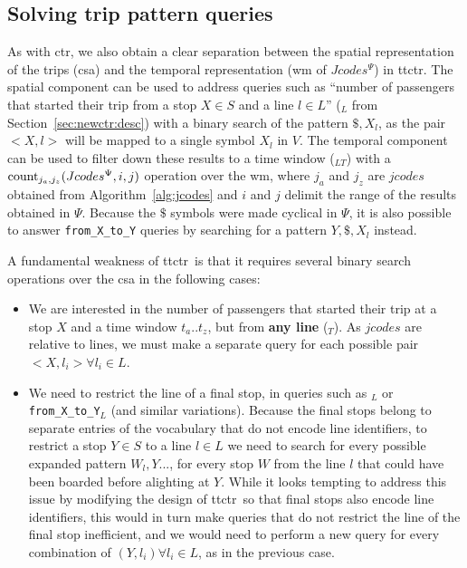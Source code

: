 	\subsection{Solving trip pattern queries}
	\label{sec:newctr:algo:xy}
	As with \gls{ctr}, we also obtain a clear separation between the spatial representation of the trips (\gls{csa}) and the temporal representation (\gls{wm} of $Jcodes^{\Psi}$) in \gls{ttctr}. The spatial component can be used to address queries such as ``number of passengers that started their trip from a stop $X\in S$ and a line $l\in L$'' (\texttt{\startX$_{L}$} from Section~\ref{sec:newctr:desc}) with a binary search of the pattern $\$,X_l$, as the pair $<X,l>$ will be mapped to a single symbol $X_l$ in $V$. The temporal component can be used to filter down these results to a time window (\texttt{\startX$_{LT}$}) with a $\operatorname{count}_{j_a,j_z}(Jcodes^{\Psi},i,j)$ operation over the \gls{wm}, where $j_a$ and $j_z$ are $jcodes$ obtained from Algorithm~\ref{alg:jcodes} and $i$ and $j$ delimit the range of the results obtained in $\Psi$. Because the $\$$ symbols were made cyclical in $\Psi$, it is also possible to answer \texttt{from\_X\_to\_Y} queries by searching for a pattern $Y,\$,X_l$ instead.
	
	A fundamental weakness of \gls{ttctr}~is that it requires several binary search operations over the \gls{csa} in the following cases:
    \begin{itemize}
        \item We are interested in the number of passengers that started their trip at a stop $X$ and a time window $t_a..t_z$, but from \textbf{any line} (\texttt{\startX$_{T}$}). As $jcodes$ are relative to lines, we must make a separate query for each possible pair $<X, l_i> \forall l_i \in L$.
        \item We need to restrict the line of a final stop, in queries such as \texttt{\endX$_{L}$} or \texttt{from\_X\_to\_Y$_{L}$} (and similar variations). Because the final stops belong to separate entries of the vocabulary that do not encode line identifiers, to restrict a stop $Y\in S$ to a line $l\in L$ we need to search for every possible expanded pattern $W_l,Y...$, for every stop $W$ from the line $l$ that could have been boarded before alighting at $Y$. While it looks tempting to address this issue by modifying the design of \gls{ttctr}~so that final stops also encode line identifiers, this would in turn make queries that do not restrict the line of the final stop inefficient, and we would need to perform a new query for every combination of $(Y, l_i) \forall l_i \in L$, as in the previous case.
    \end{itemize}
	
